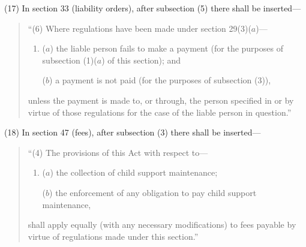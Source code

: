 \documentclass[12pt,a4paper]{article}
\begin{document}
%
%
%
%
%
%
%

(17) In section 33 (liability orders), after subsection (5)  there shall be inserted—
\begin{quotation}
“(6) Where regulations have been made under section 29(3)($a$)—
\begin{enumerate}\item[]
($a$) the liable person fails to make a payment (for the purposes of subsection (1)($a$)  of this section); and

($b$) a payment is not paid (for the purposes of subsection (3)),
\end{enumerate}
unless the payment is made to, or through, the person specified in or by virtue of those regulations for the case of the liable person in question.”
\end{quotation}

(18) In section 47 (fees), after subsection (3)  there shall be inserted—
\begin{quotation}
“(4) The provisions of this Act with respect to—
\begin{enumerate}\item[]
($a$) the collection of child support maintenance;

($b$) the enforcement of any obligation to pay child support maintenance,
\end{enumerate}
shall apply equally (with any necessary modifications) to fees payable by virtue of regulations made under this section.”
\end{quotation}
\end{document}
